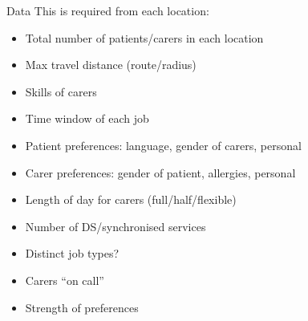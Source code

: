 \documentclass[usenames,dvipsnames]{beamer}
\begin{document}
\begin{frame}{Data}
This is required from each location:
\footnotesize
\begin{multicols}{2}
	\begin{itemize}
		\item Total number of patients/carers in each location
		\item Max travel distance (route/radius)
		\item Skills of carers
		\item Time window of each job
		\item Patient preferences: language, gender of carers, personal
		\item Carer preferences: gender of patient, allergies, personal
		\item Length of day for carers (full/half/flexible)
		\item Number of DS/synchronised services
		\item Distinct job types?
		\item Carers ``on call''
		\item Strength of preferences
	\end{itemize}	
\end{multicols}	
\end{frame}
\end{document}

